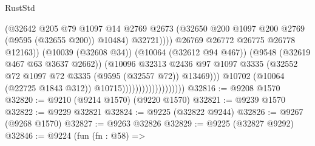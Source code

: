 \begin{lexlean}{RustStd}
\begin{coremodule}
                                                      (@32642
                                                        @205
                                                        @79
                                                        @1097
                                                        @14
                                                        @2769
                                                        @2673
                                                        (@32650
                                                          @200
                                                          @1097
                                                          @200
                                                          @2769
                                                          (@9595 (@32655 @200))
                                                          @10484)
                                                        @32721))))
                                                @26769
                                                @26772
                                                @26775
                                                @26778
                                                @12163))
                                            (@10039 (@32608 @34))
                                            (@10064 (@32612 @94 @467))
                                            (@9548 (@32619 @467 @63 @3637 @2662))
                                            (@10096
                                              @32313
                                              @2436
                                              @97
                                              @1097
                                              @3335
                                              (@32552
                                                @72
                                                @1097
                                                @72
                                                @3335
                                                (@9595 (@32557 @72))
                                                @13469)))
                                          @10702
                                          (@10064 (@22725 @1843 @312))
                                          @10715)))))))))))))))))))
@32816 := @9208 @1570
@32820 := @9210 (@9214 @1570) (@9220 @1570)
@32821 := @9239 @1570
@32822 := @9229 @32821
@32824 := @9225 (@32822 @9244)
@32826 := @9267 (@9268 @1570)
@32827 := @9263 @32826
@32829 := @9225 (@32827 @9292)
@32846 := @9224
    (fun (fn : @58) =>

\end{coremodule}
\end{lexlean}
